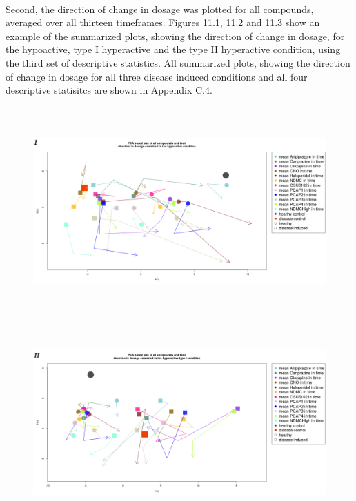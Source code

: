 \documentclass[a4paper,12pt]{article}
\begin{document}
\\Second, the direction of change in dosage was plotted for all compounds, averaged over all thirteen timeframes. Figures 11.1, 11.2 and 11.3 show an example of the summarized plots, showing the direction of change in dosage, for the hypoactive, type I hyperactive and the type II hyperactive condition, using the third set of descriptive statistics. All summarized plots, showing the direction of change in dosage for all three disease induced conditions and all four descriptive statisitcs are shown in Appendix C.4.
\newpage
\begin{figure}[h!]
\begin{center}
\includegraphics[width=16cm,height=8cm]{All_together_doses_DarkApoLowset3.png}
\includegraphics[width=16cm,height=8cm]{All_together_doses_DarkApoHighset3.png}
\end{center}
\end{figure}
\newpage
\end{document}
